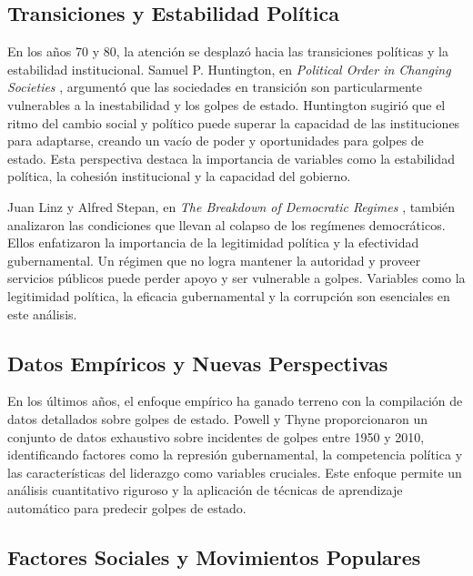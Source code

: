 \documentclass{article}
\begin{document}
\subsection{Transiciones y Estabilidad Política}

En los años 70 y 80, la atención se desplazó hacia las transiciones políticas y la 
estabilidad institucional. Samuel P. Huntington, en \textit{Political Order in 
Changing Societies} \cite{huntington2006political}, argumentó que las sociedades en 
transición son particularmente vulnerables a la inestabilidad y los golpes de 
estado. Huntington sugirió que el ritmo del cambio social y político puede superar 
la capacidad de las instituciones para adaptarse, creando un vacío de poder y 
oportunidades para golpes de estado. Esta perspectiva destaca la importancia de 
variables como la estabilidad política, la cohesión institucional y la capacidad del 
gobierno.

Juan Linz y Alfred Stepan, en \textit{The Breakdown of Democratic Regimes} 
\cite{linz1978breakdown}, también analizaron las condiciones que llevan al colapso 
de los regímenes democráticos. Ellos enfatizaron la importancia de la legitimidad 
política y la efectividad gubernamental. Un régimen que no logra mantener la 
autoridad y proveer servicios públicos puede perder apoyo y ser vulnerable a golpes. 
Variables como la legitimidad política, la eficacia gubernamental y la corrupción 
son esenciales en este análisis.

\subsection{Datos Empíricos y Nuevas Perspectivas}

En los últimos años, el enfoque empírico ha ganado terreno con la compilación de 
datos detallados sobre golpes de estado. Powell y Thyne \cite{Pow11} proporcionaron 
un conjunto de datos exhaustivo sobre incidentes de golpes entre 1950 y 2010, 
identificando factores como la represión gubernamental, la competencia política y 
las características del liderazgo como variables cruciales. Este enfoque permite un 
análisis cuantitativo riguroso y la aplicación de técnicas de aprendizaje automático 
para predecir golpes de estado.

\subsection{Factores Sociales y Movimientos Populares}
\end{document}
